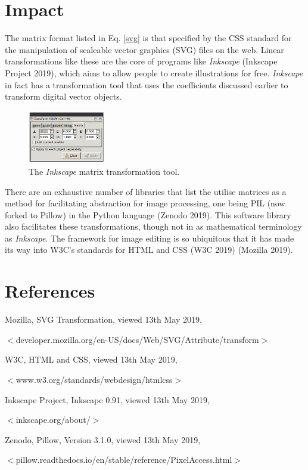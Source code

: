 \documentclass{article}
\begin{document}
\clearpage
\section{Impact} 

The matrix format listed in Eq. \ref{svg} is that specified by the CSS standard
for the manipulation of scaleable vector graphics (SVG) files on the web.
Linear transformations like these are the core of programs like
\textit{Inkscape} (Inkscape Project 2019), which aims to allow people to 
create illustrations for free. \textit{Inkscape} in fact has a transformation
tool that uses the coefficients discussed earlier to transform digital vector objects.

\begin{figure}[!htbp]
    \centering
    \includegraphics[width=0.3\textwidth]{inkscape}
    \caption{The \textit{Inkscape} matrix transformation tool.}
\end{figure}
    
There are an exhaustive number of libraries that list the utilise matrices as a
method for facilitating abstraction for image processing, one being PIL (now
forked to Pillow) in the Python language (Zenodo 2019). This software library
also facilitates these transformations, though not in as mathematical terminology 
as \textit{Inkscape}. The framework for image editing is so ubiquitous that it 
has made its way into W3C's standards for HTML and CSS (W3C 2019) (Mozilla
2019). 

\clearpage
\section{References} 


Mozilla, SVG Transformation, viewed 13th May 2019,

\qquad $<$developer.mozilla.org/en-US/docs/Web/SVG/Attribute/transform$>$


\vspace{2mm}
W3C, HTML and CSS, viewed 13th May 2019,

\qquad $<$www.w3.org/standards/webdesign/htmlcss$>$


\vspace{2mm}
Inkscape Project, Inkscape 0.91, viewed 13th May 2019,

\qquad $<$inkscape.org/about/$>$


\vspace{2mm}
Zenodo, Pillow, Version 3.1.0, viewed 13th May 2019,

\qquad $<$pillow.readthedocs.io/en/stable/reference/PixelAccess.html$>$
\end{document}
